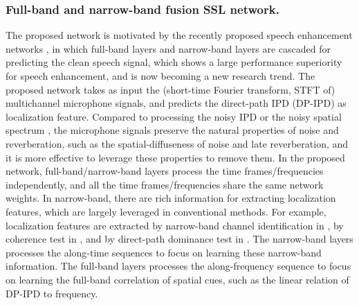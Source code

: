 \documentclass[lettersize,journal]{IEEEtran}
\begin{document}
\subsubsection{Full-band and narrow-band fusion SSL network.} The proposed network is motivated by the recently proposed speech enhancement networks \cite{tesch2022insights, Yang2022McNetFM,quan2023spatialnet}, in which full-band layers and narrow-band layers are cascaded for predicting the clean speech signal, which shows a large performance superiority for speech enhancement, and is now becoming a new research trend. 
The proposed network takes as input the (short-time Fourier transform, STFT of) multichannel microphone signals, and predicts the direct-path IPD (DP-IPD) as localization feature.   
Compared to processing the noisy IPD \cite{Nguyen2021SALSALiteAF} or the noisy spatial spectrum \cite{DiazGuerra2020RobustSS,DiazGuerra2022DirectionOA}, the microphone signals preserve the natural properties of noise and reverberation, such as the spatial-diffuseness of noise and late reverberation, and it is more effective to leverage these properties to remove them. In the proposed network, full-band/narrow-band layers process the time frames/frequencies independently, and all the time
frames/frequencies share the same network weights. In narrow-band, there are rich information for extracting localization features, which are largely leveraged in conventional methods. For example, localization features are extracted by narrow-band channel identification in \cite{7533416}, by coherence test in \cite{Mohan2008LocalizationOM}, and by direct-path dominance test in \cite{Nadiri2014LocalizationOM}. The narrow-band layers processes the along-time sequences to focus on learning these narrow-band information.
The full-band layers processes the along-frequency sequence to focus on learning the full-band correlation of spatial cues, such as the linear relation of DP-IPD to frequency.
\end{document}
